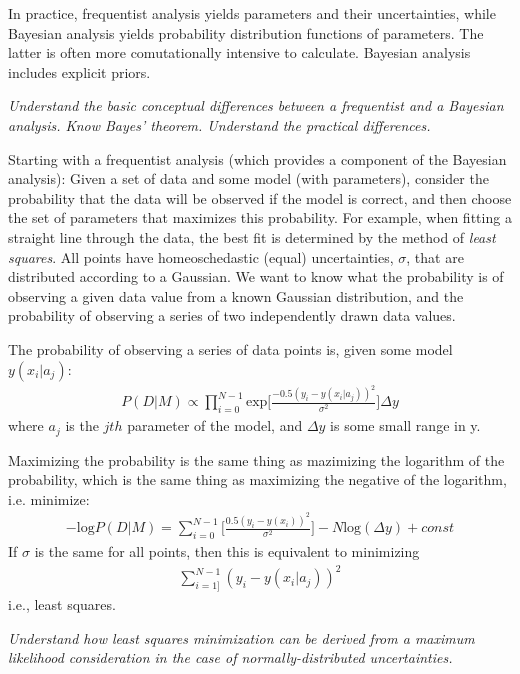 \documentclass[12pt]{article}
\begin{document}
In practice, frequentist analysis yields parameters and their uncertainties,
while Bayesian analysis yields probability distribution functions of parameters.
The latter is often more comutationally intensive to calculate. Bayesian analysis
includes explicit priors. \\

\colorbox{hl}{\parbox{0.9\textwidth}
{\emph{Understand the basic conceptual differences between a frequentist
        and a Bayesian analysis. Know Bayes' theorem. Understand the practical
       differences.}}}

Starting with a frequentist analysis (which provides a component of the
Bayesian analysis): Given a set of data and some model (with parameters),
consider the probability that the data will be observed if the model is correct,
and then choose the set of parameters that maximizes this probability.
For example, when fitting a straight line through the data, the best fit is
determined by the method of \emph{least squares}. All points have homeoschedastic
(equal)
uncertainties, $\sigma$, that are distributed according to a Gaussian. We want
to know what the probability is of observing a given data value from a known
Gaussian distribution, and the probability of observing a series of two
independently drawn data values.

The probability of observing a series of data points is, given some model
$y(x_i|a_j)$:
\begin{align*}
    P(D|M) \propto \prod^{N-1}_{i=0}\mathrm{exp}
    \Bigg[\frac{-0.5(y_i-y(x_i|a_j))^2}
    {\sigma^2}\Bigg]\Delta y
\end{align*}
where $a_j$ is the $jth$ parameter of the model, and $\Delta y$ is some small
range in y.

Maximizing the probability is the same thing as mazimizing the logarithm of
the probability, which is the same thing as maximizing the negative of the
logarithm, i.e. minimize:
\begin{align*}
    -\mathrm{log} P(D|M) = \sum^{N-1}_{i=0}\Bigg[\frac
        {0.5(y_i-y(x_i))^2}{\sigma^2}\Bigg]
        -N\mathrm{log}(\Delta y) + const
\end{align*}
If $\sigma$ is the same for all points, then this is equivalent to minimizing
\begin{align*}
    \sum^{N-1}_{i=1]}(y_i-y(x_i|a_j))^2
\end{align*}
i.e., least squares. \\

\colorbox{hl}{\parbox{0.9\textwidth}
{\emph{Understand how least squares minimization can be derived from a maximum
        likelihood consideration in the case of normally-distributed
        uncertainties.}}}
\end{document}
